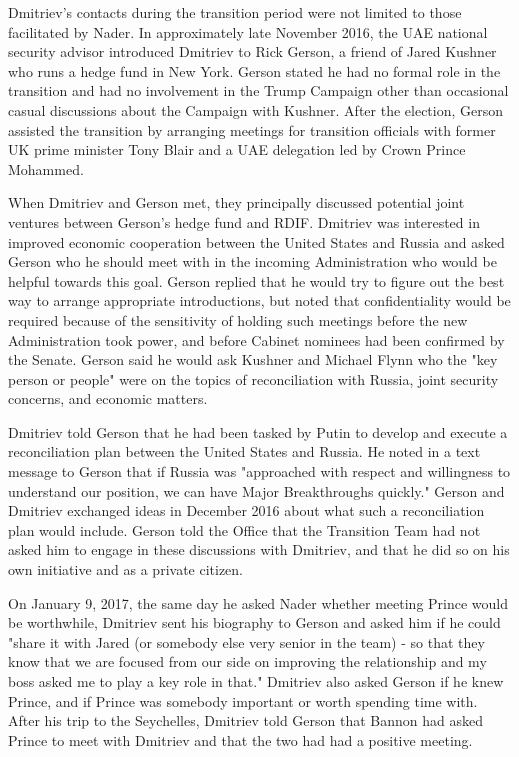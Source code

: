 Dmitriev's contacts during the transition period were not limited to those facilitated by Nader.
In approximately late November 2016, the UAE national security advisor introduced Dmitriev to Rick Gerson, a friend of Jared Kushner who runs a hedge fund in New York.%
Gerson stated he had no formal role in the transition and had no involvement in the Trump Campaign other than occasional casual discussions about the Campaign with Kushner.%
After the election, Gerson assisted the transition by arranging meetings for transition officials with former UK prime minister Tony Blair and a UAE delegation led by Crown Prince Mohammed.%

When Dmitriev and Gerson met, they principally discussed potential joint ventures between Gerson's hedge fund and RDIF.%
Dmitriev was interested in improved economic cooperation between the United States and Russia and asked Gerson who he should meet with in the incoming Administration who would be helpful towards this goal.%
Gerson replied that he would try to figure out the best way to arrange appropriate introductions, but noted that confidentiality would be required because of the sensitivity of holding such meetings before the new Administration took power, and before Cabinet nominees had been confirmed by the Senate.%
Gerson said he would ask Kushner and Michael Flynn who the "key person or people" were on the topics of reconciliation with Russia, joint security concerns, and economic matters.%

Dmitriev told Gerson that he had been tasked by Putin to develop and execute a reconciliation plan between the United States and Russia.
He noted in a text message to Gerson that if Russia was "approached with respect and willingness to understand our position, we can have Major Breakthroughs quickly."%
Gerson and Dmitriev exchanged ideas in December 2016 about what such a reconciliation plan would include.%
Gerson told the Office that the Transition Team had not asked him to engage in these discussions with Dmitriev, and that he did so on his own initiative and as a private citizen.%

On January 9, 2017, the same day he asked Nader whether meeting Prince would be worthwhile, Dmitriev sent his biography to Gerson and asked him if he could "share it with Jared (or somebody else very senior in the team) - so that they know that we are focused from our side on improving the relationship and my boss asked me to play a key role in that."%
Dmitriev also asked Gerson if he knew Prince, and if Prince was somebody important or worth spending time with.%
After his trip to the Seychelles, Dmitriev told Gerson that Bannon had asked Prince to meet with Dmitriev and that the two had had a positive meeting.%

